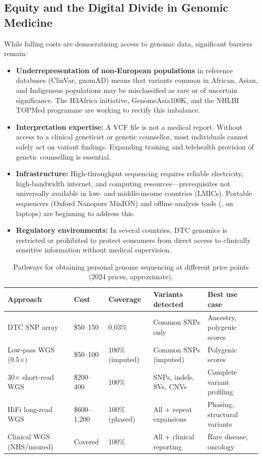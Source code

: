 \subsection{Equity and the Digital Divide in Genomic Medicine}
\label{subsec:demo:equity}

While falling costs are democratising access to genomic data, significant barriers remain:

\begin{itemize}[itemsep=3pt]
  \item \textbf{Underrepresentation of non-European populations} in reference databases (ClinVar, gnomAD) means that variants common in African, Asian, and Indigenous populations may be misclassified as rare or of uncertain significance. The H3Africa initiative, GenomeAsia100K, and the NHLBI TOPMed programme are working to rectify this imbalance.
  \item \textbf{Interpretation expertise:} A VCF file is not a medical report. Without access to a clinical geneticist or genetic counsellor, most individuals cannot safely act on variant findings. Expanding training and telehealth provision of genetic counselling is essential.
  \item \textbf{Infrastructure:} High-throughput sequencing requires reliable electricity, high-bandwidth internet, and computing resources---prerequisites not universally available in low- and middle-income countries (LMICs). Portable sequencers (Oxford Nanopore MinION) and offline analysis tools (,  on laptops) are beginning to address this.
  \item \textbf{Regulatory environments:} In several countries, DTC genomics is restricted or prohibited to protect consumers from direct access to clinically sensitive information without medical supervision.
\end{itemize}

\begin{table}[htbp]
\centering
\caption{Pathways for obtaining personal genome sequencing at different price points (2024 prices, approximate).}
\label{tab:personal-genomics}
\small
\begin{tabularx}{\textwidth}{@{}l l l l >{\raggedright\arraybackslash}X@{}}
\toprule
\textbf{Approach} & \textbf{Cost} & \textbf{Coverage} & \textbf{Variants detected} & \textbf{Best use case} \\
\midrule
DTC SNP array & \$50--150 & 0.03\% & Common SNPs only & Ancestry, polygenic scores \\
Low-pass WGS (0.5$\times$) & \$50--100 & 100\% (imputed) & Common SNPs (imputed) & Polygenic scores \\
30$\times$ short-read WGS & \$200--400 & 100\% & SNPs, indels, SVs, CNVs & Complete variant profiling \\
HiFi long-read WGS & \$600--1,200 & 100\% (phased) & All + repeat expansions & Phasing, structural variants \\
Clinical WGS (NHS/insured) & Covered & 100\% & All + clinical reporting & Rare disease, oncology \\
\bottomrule
\end{tabularx}
\end{table}

